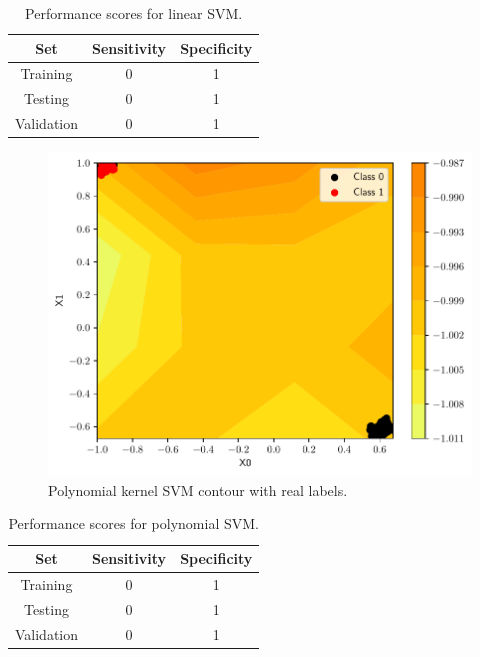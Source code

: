 \documentclass[conference]{IEEEtran}
\theoremstyle{definition}
\theoremstyle{remark}
\theoremstyle{remark}
\begin{document}
\begin{table}
\centering
\caption{Performance scores for linear SVM.}
\label{tab:linear_SVM_emb}
\begin{tabular}{ccc}
\hline
\textbf{Set} & \textbf{Sensitivity} & \textbf{Specificity} \\ \hline
Training & 0 & 1 \\
Testing & 0 & 1 \\
Validation & 0 & 1 \\ \hline
\end{tabular}
\end{table}

\begin{figure}
  \includegraphics[width=\columnwidth]{figs/svm-emb-poly-contour-0-1.pdf}
  \caption{Polynomial kernel SVM contour with real labels.}
\end{figure}

\begin{table}
\centering
\caption{Performance scores for polynomial SVM.}
\label{tab:poly_SVM_emb}
\begin{tabular}{ccc}
\hline
\textbf{Set} & \textbf{Sensitivity} & \textbf{Specificity} \\ \hline
Training & 0 & 1 \\
Testing & 0 & 1 \\
Validation & 0 & 1 \\ \hline
\end{tabular}
\end{table}
\end{document}
